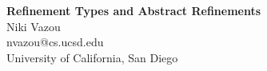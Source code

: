 \documentclass[runningheads,a4paper]{article}
\makeatletter
\newcommand{\at}{\makeatletter @\makeatother}
\newcommand\mytitle{Refinement Types and Abstract Refinements}
\newcommand\myauthor{Niki Vazou}
\newcommand\institution{University of California, San Diego}
\newcommand\myemail{nvazou\at cs.ucsd.edu}
\newcommand{\mymaketitle}{
  \begin{center}
  	{\LARGE\bf \mytitle \\ \vspace{1cm}}%
    {\Large \myauthor \\}%
 	{\large \myemail \\}%
  	{\large \institution \\}%
  \end{center}
  \par}
\makeatother
\begin{document}
\mymaketitle
\begin{abstract}

\end{abstract}








%
%
\end{document}
